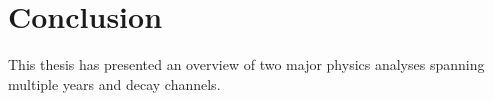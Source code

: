 \chapter{Conclusion}

This thesis has presented an overview of two major physics analyses spanning multiple years and decay channels.